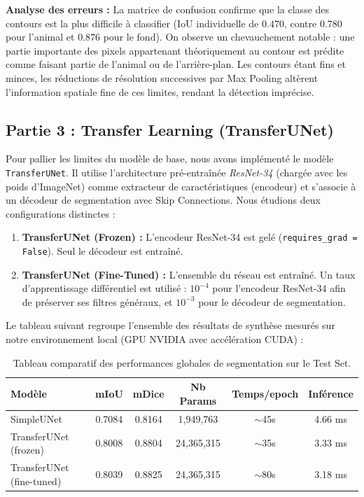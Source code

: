 \documentclass[12pt, a4paper]{article}
\begin{document}
\textbf{Analyse des erreurs :} 
La matrice de confusion confirme que la classe des contours est la plus difficile à classifier (IoU individuelle de $0.470$, contre $0.780$ pour l'animal et $0.876$ pour le fond). On observe un chevauchement notable : une partie importante des pixels appartenant théoriquement au contour est prédite comme faisant partie de l'animal ou de l'arrière-plan. Les contours étant fins et minces, les réductions de résolution successives par Max Pooling altèrent l'information spatiale fine de ces limites, rendant la détection imprécise.

\newpage
\subsection{Partie 3 : Transfer Learning (TransferUNet)}
Pour pallier les limites du modèle de base, nous avons implémenté le modèle \texttt{TransferUNet}. Il utilise l'architecture pré-entraînée \textit{ResNet-34} (chargée avec les poids d'ImageNet) comme extracteur de caractéristiques (encodeur) et s'associe à un décodeur de segmentation avec Skip Connections. Nous étudions deux configurations distinctes :
\begin{enumerate}
    \item \textbf{TransferUNet (Frozen) :} L'encodeur ResNet-34 est gelé (\texttt{requires\_grad = False}). Seul le décodeur est entraîné.
    \item \textbf{TransferUNet (Fine-Tuned) :} L'ensemble du réseau est entraîné. Un taux d'apprentissage différentiel est utilisé : $10^{-4}$ pour l'encodeur ResNet-34 afin de préserver ses filtres généraux, et $10^{-3}$ pour le décodeur de segmentation.
\end{enumerate}

Le tableau suivant regroupe l'ensemble des résultats de synthèse mesurés sur notre environnement local (GPU NVIDIA avec accélération CUDA) :

\begin{table}[H]
\centering
\begin{tabular}{@{}lccccc@{}}
\toprule
\textbf{Modèle} & \textbf{mIoU} & \textbf{mDice} & \textbf{Nb Params} & \textbf{Temps/epoch} & \textbf{Inférence} \\ \midrule
SimpleUNet & 0.7084 & 0.8164 & 1,949,763 & $\sim$45s & 4.66 ms \\
TransferUNet (frozen) & 0.8008 & 0.8804 & 24,365,315 & $\sim$35s & 3.33 ms \\
TransferUNet (fine-tuned) & 0.8039 & 0.8825 & 24,365,315 & $\sim$80s & 3.18 ms \\ \bottomrule
\end{tabular}
\caption{Tableau comparatif des performances globales de segmentation sur le Test Set.}
\end{table}
\end{document}
